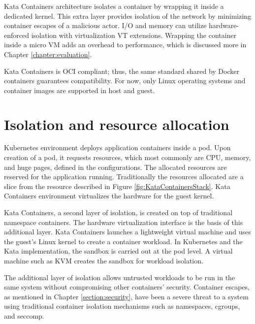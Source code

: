Kata Containers architecture isolates a container by wrapping it inside a dedicated kernel. This extra layer provides isolation of the network by minimizing container escapes of a malicious actor. I/O and memory can utilize hardware-enforced isolation with virtualization VT extensions. Wrapping the container inside a micro VM adds an overhead to performance, which is discussed more in Chapter \ref{chapter:evaluation}. \cite{KataContainers}

Kata Containers is OCI compliant; thus, the same standard shared by Docker containers guarantees compatibility. For now, only Linux operating systems and container images are supported in host and guest.

\section{Isolation and resource allocation}

Kubernetes environment deploys application containers inside a pod. Upon creation of a pod, it requests resources, which most commonly are CPU, memory, and huge pages, defined in the configurations. The allocated resources are reserved for the application running. Traditionally the resources allocated are a slice from the resource described in Figure \ref{fig:KataContainersStack}. Kata Containers environment virtualizes the hardware for the guest kernel.

Kata Containers, a second layer of isolation, is created on top of traditional namespace containers. The hardware virtualization interface is the basis of this additional layer. Kata Containers launches a lightweight virtual machine and uses the guest's Linux kernel to create a container workload. In Kubernetes and the Kata implementation, the sandbox is carried out at the pod level. A virtual machine such as KVM creates the sandbox for workload isolation. \cite{KataContainersVirtualization}

The additional layer of isolation allows untrusted workloads to be run in the same system without compromising other containers' security. Container escapes, as mentioned in Chapter \ref{section:security}, have been a severe threat to a system using traditional container isolation mechanisms such as namespaces, cgroups, and seccomp.

